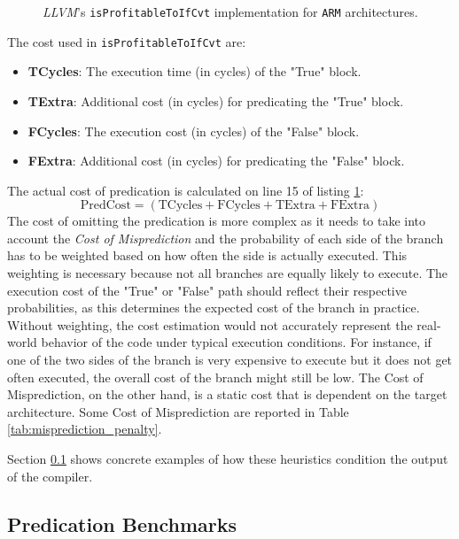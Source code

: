 \begin{figure}[H]
    \centering
    
    \caption{\textit{LLVM}'s \texttt{isProfitableToIfCvt} implementation for \texttt{ARM} architectures.}
    \label{lst:predications_heuristic}
\end{figure}

The cost used in \texttt{isProfitableToIfCvt} are:

\begin{itemize}
    \item \textbf{TCycles}: The execution time (in cycles) of the "True" block.
    \item \textbf{TExtra}: Additional cost (in cycles) for predicating the "True" block.
    \item \textbf{FCycles}: The execution cost (in cycles) of the "False" block.
    \item \textbf{FExtra}: Additional cost (in cycles) for predicating the "False" block.
\end{itemize}

The actual cost of predication is calculated on line 15 of listing \ref{lst:predications_heuristic}:
\[
\text{PredCost} = (\text{TCycles} + \text{FCycles} + \text{TExtra} + \text{FExtra})
\]
The cost of omitting the predication is more complex as it needs to take into account the \textit{Cost of Misprediction} and the probability of each side of the branch has to be weighted based on how often the side is actually executed.
This weighting is necessary because not all branches are equally likely to execute. The execution cost of the "True" or "False" path should reflect their respective probabilities, as this determines the expected cost of the branch in practice. Without weighting, the cost estimation would not accurately represent the real-world behavior of the code under typical execution conditions. For instance, if one of the two sides of the branch is very expensive to execute but it does not get often executed, the overall cost of the branch might still be low.
The {Cost of Misprediction}, on the other hand, is a static cost that is dependent on the target architecture. Some {Cost of Misprediction} are reported in Table \ref{tab:misprediction_penalty}.

Section \ref{sec:predication_benchmark} shows concrete examples of how these heuristics condition the output of the compiler.

\subsection{Predication Benchmarks}
\label{sec:predication_benchmark}

